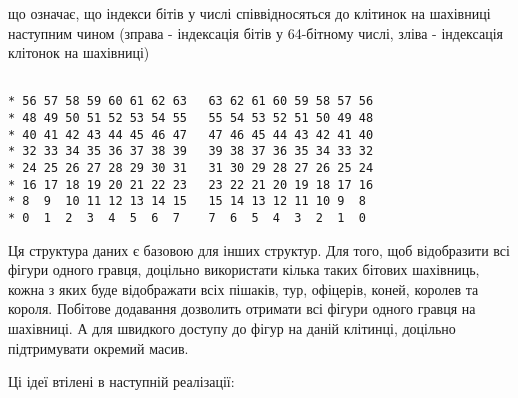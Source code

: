 \documentclass[12pt,a4paper]{article}
\begin{document}
\fontsize{14pt}{6mm}\selectfont

що означає, що індекси бітів у числі співвідносяться до клітинок на шахівниці
наступним чином (зправа - індексація бітів у 64-бітному числі, зліва -
індексація клітонок на шахівниці)

\singlespacing

\begin{lstlisting}

* 56 57 58 59 60 61 62 63   63 62 61 60 59 58 57 56
* 48 49 50 51 52 53 54 55   55 54 53 52 51 50 49 48
* 40 41 42 43 44 45 46 47   47 46 45 44 43 42 41 40
* 32 33 34 35 36 37 38 39   39 38 37 36 35 34 33 32
* 24 25 26 27 28 29 30 31   31 30 29 28 27 26 25 24
* 16 17 18 19 20 21 22 23   23 22 21 20 19 18 17 16
* 8  9  10 11 12 13 14 15   15 14 13 12 11 10 9  8
* 0  1  2  3  4  5  6  7    7  6  5  4  3  2  1  0

\end{lstlisting}

\fontsize{14pt}{6mm}\selectfont

Ця структура даних є базовою для інших структур. Для того, щоб відобразити всі
фігури одного гравця, доцільно використати кілька таких бітових шахівниць,
кожна з яких буде відображати всіх пішаків, тур, офіцерів, коней, королев та
короля. Побітове додавання дозволить отримати всі фігури одного гравця на
шахівниці. А для швидкого доступу до фігур на даній клітинці, доцільно
підтримувати окремий масив.

Ці ідеї втілені в наступній реалізації:

\singlespacing
\end{document}
